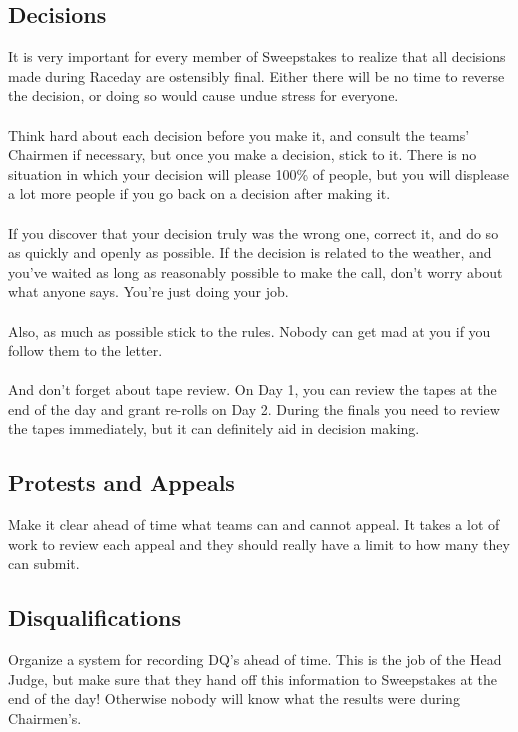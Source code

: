 \subsection{Decisions}
It is very important for every member of Sweepstakes to realize that all
decisions made during Raceday are ostensibly final. Either there will be
no time to reverse the decision, or doing so would cause undue stress for
everyone.
\\\\
Think hard about each decision before you make it, and consult the teams'
Chairmen if necessary, but once you make a decision, stick to it. There is no
situation in which your decision will please 100\% of people, but you will
displease a lot more people if you go back on a decision after making it.
\\\\
If you discover that your decision truly was the wrong one, correct it,
and do so as quickly and openly as possible. If the decision is related to
the weather, and you've waited as long as reasonably possible to make the call,
don't worry about what anyone says. You're just doing your job.
\\\\
Also, as much as possible stick to the rules. Nobody can get mad at you
if you follow them to the letter.
\\\\
And don't forget about tape review. On Day 1, you can review the tapes at the
end of the day and grant re-rolls on Day 2. During the finals you need to
review the tapes immediately, but it can definitely aid in decision making.

\subsection{Protests and Appeals}
Make it clear ahead of time what teams can and cannot appeal. It takes a
lot of work to review each appeal and they should really have a limit
to how many they can submit.

\subsection{Disqualifications}
Organize a system for recording DQ's ahead of time. This is the
job of the Head Judge, but make sure that they hand off this information
to Sweepstakes at the end of the day! Otherwise nobody will know what the
results were during Chairmen's.

